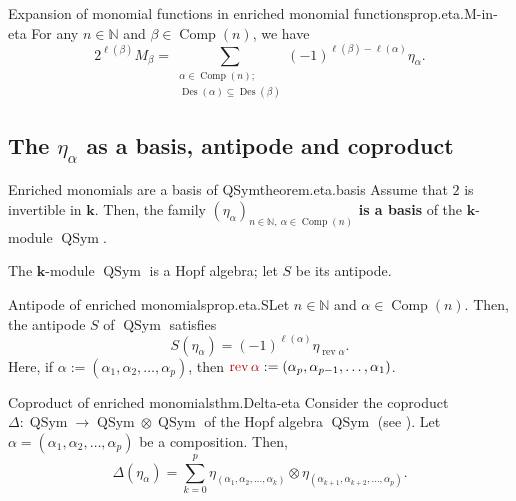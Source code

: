 \documentclass[numbers=enddot,12pt,final,onecolumn,notitlepage]{scrartcl}%
\newcommand{\al}{\alpha}
\newcommand{\NN}{\mathbb{N}} %
\newcommand{\kk}{\mathbf{k}} %
\newcommand{\QSym}{\operatorname{QSym}}
\newcommand{\Des}{\operatorname{Des}}
\newcommand{\Comp}{\operatorname{Comp}}
\newcommand{\tup}[1]{\left( #1 \right)}
\newcommand{\defnm}[1]{{\color{darkred} #1}}
\newcommand{\0}{\phantom{c}}
\let\sumnonlimits\sum
\renewcommand{\sum}{\sumnonlimits\limits}
\begin{document}
\begin{proposition}{Expansion of monomial functions in enriched monomial functions}{prop.eta.M-in-eta}
For any $n\in\NN$ and $\beta\in \Comp(n)$, we have
\[
2^{\ell\left(  \beta\right)  }M_{\beta}=\sum_{\substack{\alpha\in
\Comp(n);\\\Des\left(  \alpha\right)  \subseteq \Des\left(
\beta\right)  }}\left(  -1\right)  ^{\ell\left(  \beta\right)  -\ell\left(
\alpha\right)  }\eta_{\alpha}.
\]
\end{proposition}

\subsection{The $\eta_{\alpha}$ as a basis, antipode and coproduct}
\begin{theorem}{Enriched monomials are a basis of QSym}{theorem.eta.basis}
Assume that $2$ is invertible in $\kk$. Then, the
family $\left(  \eta_{\alpha}\right)  _{n \in \NN,\ \alpha\in\Comp(n)}$ \textbf{is a basis} of the $\kk$-module $\QSym$.
\end{theorem}

The $\kk$-module $\QSym$ is a Hopf algebra; let $S$ be its antipode.

\begin{proposition}{Antipode of enriched monomials}{prop.eta.S}Let $n \in \NN$ and $\alpha\in\Comp(n)$. Then, the antipode $S$
of $\QSym$ satisfies
\[
S\left(  \eta_{\alpha}\right)  =\left(  -1\right)  ^{\ell\left(
\alpha\right)  }\eta_{\operatorname*{rev}\alpha}.
\]
Here, if $\alpha := \tup{\alpha_1, \alpha_2, \ldots, \alpha_p}$, then
$\defnm{\operatorname{rev}\alpha} := \tup{\alpha_p, \alpha_{p-1}, \ldots, \alpha_1}$.
\end{proposition}

\begin{theorem}{Coproduct of enriched monomials}{thm.Delta-eta} Consider the coproduct $\Delta:\operatorname*{QSym}\rightarrow
\operatorname*{QSym}\otimes\operatorname*{QSym}$ of the Hopf algebra
$\operatorname*{QSym}$ (see \cite[\S 5.1]{GriRei20}). Let $\alpha = \left(\al_1, \al_2, \ldots, \al_p\right)$
be a composition. Then,
\[
\Delta\left(  \eta_{\alpha}\right)  =\sum_{k=0}^p
\eta_{\left(\al_1, \al_2, \ldots, \al_k\right)} \otimes
\eta_{\left(\al_{k+1}, \al_{k+2}, \ldots, \al_p\right)} .
\]

\end{theorem}

\end{document}
